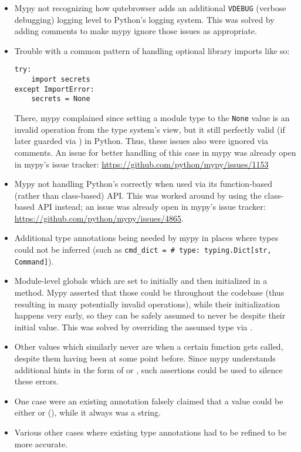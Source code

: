 \begin{itemize}
  \item Mypy not recognizing how qutebrowser adds an additional \verb|VDEBUG|
    (verbose debugging) logging level to Python's logging system. This was
    solved by adding  comments to make mypy ignore those
    issues as appropriate.
  \item Trouble with a common pattern of handling optional library imports like so:
    \begin{verbatim}
try:
    import secrets
except ImportError:
    secrets = None
\end{verbatim}
    There, mypy complained since setting a module type to the
    \verb|None| value is an invalid operation from the type system's view, but
    it still perfectly valid (if later guarded via )
    in Python. Thus, these issues also were ignored via 
    comments. An issue for better handling of this case in mypy was already
    open in mypy's issue tracker: \url{https://github.com/python/mypy/issues/1153}
  \item Mypy not handling Python's  correctly when used via
    its function-based (rather than class-based) API. This was worked around by
    using the class-based API instead; an issue was already open in mypy's issue
    tracker: \url{https://github.com/python/mypy/issues/4865}.
  \item Additional type annotations being needed by mypy in places where types
    could not be inferred (such as \texttt{cmd_dict = {} # type: typing.Dict[str, Command]}).
  \item Module-level globals which are set to  initially and then
    initialized in a  method. Mypy asserted that those could be 
    throughout the codebase (thus resulting in many potentially invalid operations),
    while their initialization happens very early, so they can be safely assumed
    to never be  despite their initial value. This was solved by
    overriding the assumed type via .
  \item Other values which similarly never are  when a certain function
    gets called, despite them having been  at some point before. Since
    mypy understands additional hints in the form of  or , such assertions could be used
    to silence these errors.
  \item One case were an existing annotation falsely claimed that a value could
    be either  or  (), while it
    always was a string.
  \item Various other cases where existing type annotations had to be refined to
    be more accurate.
\end{itemize}

